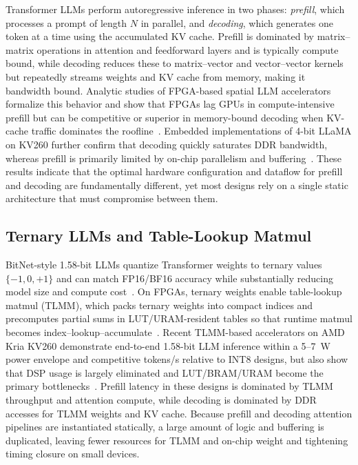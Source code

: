 \documentclass[9pt,sigconf]{acmart}
\begin{document}
Transformer LLMs perform autoregressive inference in two phases: \emph{prefill}, which processes a prompt of length $N$ in parallel, and \emph{decoding}, which generates one token at a time using the accumulated KV cache. Prefill is dominated by matrix--matrix operations in attention and feedforward layers and is typically compute bound, while decoding reduces these to matrix--vector and vector--vector kernels but repeatedly streams weights and KV cache from memory, making it bandwidth bound. Analytic studies of FPGA-based spatial LLM accelerators formalize this behavior and show that FPGAs lag GPUs in compute-intensive prefill but can be competitive or superior in memory-bound decoding when KV-cache traffic dominates the roofline~\cite{chen2023spatial}. Embedded implementations of 4-bit LLaMA on KV260 further confirm that decoding quickly saturates DDR bandwidth, whereas prefill is primarily limited by on-chip parallelism and buffering~\cite{li2025pushing,li2025hummingbird}. These results indicate that the optimal hardware configuration and dataflow for prefill and decoding are fundamentally different, yet most designs rely on a single static architecture that must compromise between them.

\subsection{Ternary LLMs and Table-Lookup Matmul}

BitNet-style 1.58-bit LLMs quantize Transformer weights to ternary values $\{-1,0,+1\}$ and can match FP16/BF16 accuracy while substantially reducing model size and compute cost~\cite{ma2024bitnet}. On FPGAs, ternary weights enable table-lookup matmul (TLMM), which packs ternary weights into compact indices and precomputes partial sums in LUT/URAM-resident tables so that runtime matmul becomes index--lookup--accumulate~\cite{qiao2025tellmev2}. Recent TLMM-based accelerators on AMD Kria KV260 demonstrate end-to-end 1.58-bit LLM inference within a 5--7~W power envelope and competitive tokens/s relative to INT8 designs, but also show that DSP usage is largely eliminated and LUT/BRAM/URAM become the primary bottlenecks~\cite{qiao2025tellme,qiao2025tellmev2,qiao2025cobra}. Prefill latency in these designs is dominated by TLMM throughput and attention compute, while decoding is dominated by DDR accesses for TLMM weights and KV cache. Because prefill and decoding attention pipelines are instantiated statically, a large amount of logic and buffering is duplicated, leaving fewer resources for TLMM and on-chip weight and tightening timing closure on small devices.
\end{document}
